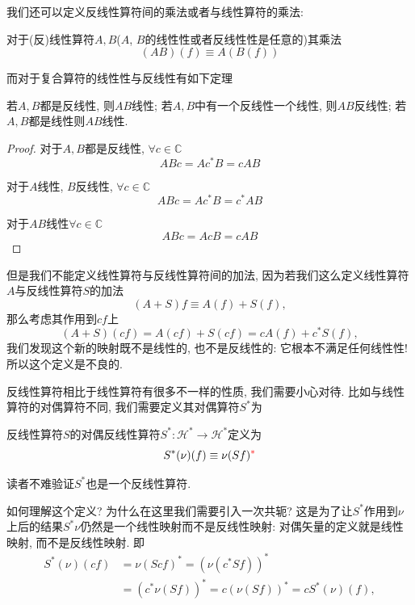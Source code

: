 我们还可以定义反线性算符间的乘法或者与线性算符的乘法:
\begin{definition}[(反)线性算符的乘法]
    对于(反)线性算符$A, B$($A$, $B$的线性性或者反线性性是任意的)其乘法
    \begin{equation}
        (AB)(f)\equiv A(B(f))
    \end{equation}
\end{definition}

而对于复合算符的线性性与反线性有如下定理
\begin{theorem}\label{anti-linear-multiplication}
    若$A, B$都是反线性, 则$AB$线性; 若$A, B$中有一个反线性一个线性, 则$AB$反线性; 若$A, B$都是线性则$AB$线性.
\end{theorem}
\begin{proof}
    对于$A, B$都是反线性, $\forall c\in\mathbb C$
    \begin{equation}
        ABc=Ac^*B=cAB
    \end{equation}

    对于$A$线性, $B$反线性, $\forall c\in\mathbb C$
    \begin{equation}
        ABc=Ac^*B=c^*AB
    \end{equation}

    对于$AB$线性$\forall c\in\mathbb C$
    \begin{equation}
        ABc=AcB=cAB
    \end{equation}
\end{proof}

但是我们不能定义线性算符与反线性算符间的加法, 因为若我们这么定义线性算符$A$与反线性算符$S$的加法
\begin{equation}
    (A+S)f\equiv A(f)+S(f),
\end{equation}
那么考虑其作用到$cf$上
\begin{equation}
    (A+S)(cf)=A(cf)+S(cf)=cA(f)+c^*S(f),
\end{equation}
我们发现这个新的映射既不是线性的, 也不是反线性的: 它根本不满足任何线性性! 所以这个定义是不良的.

反线性算符相比于线性算符有很多不一样的性质, 我们需要小心对待. 比如与线性算符的对偶算符不同, 我们需要定义其对偶算符$S^*$为
\begin{definition}[对偶线性算符]
    反线性算符$S$的对偶反线性算符$S^*: \mathscr H^* \to \mathscr H^*$定义为
    \begin{equation}
        S^*(\nu)(f)\equiv\nu(Sf)^{\textcolor{red}{\mathbf*}}
    \end{equation}
    
    读者不难验证$S^*$也是一个反线性算符.
\end{definition}
如何理解这个定义? 为什么在这里我们需要引入一次共轭? 这是为了让$S^*$作用到$\nu$上后的结果$S^*\nu$仍然是一个线性映射而不是反线性映射: 对偶矢量的定义就是线性映射, 而不是反线性映射. 即
\begin{equation}
    \begin{aligned}
        S^*(\nu)(cf)&=\nu(Scf)^*=(\nu(c^*Sf))^*\\
        &=(c^*\nu(Sf))^*=c(\nu(Sf))^*=cS^*(\nu)(f),
    \end{aligned}
\end{equation}

